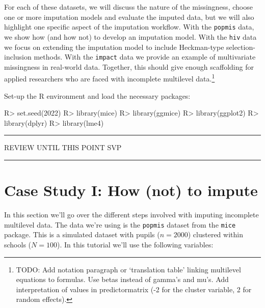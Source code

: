 \documentclass[
]{jss}
\begin{document}
For each of these datasets, we will discuss the nature of the
missingness, choose one or more imputation models and evaluate the
imputed data, but we will also highlight one specific aspect of the
imputation workflow. With the \texttt{popmis} data, we show how (and how
not) to develop an imputation model. With the \texttt{hiv} data we focus
on extending the imputation model to include Heckman-type
selection-inclusion methods. With the \texttt{impact} data we provide an
example of multivariate missingness in real-world data. Together, this
should give enough scaffolding for applied researchers who are faced
with incomplete multilevel data.\footnote{TODO: Add notation paragraph
  or `translation table' linking multilevel equations to 
  formulas. Use betas instead of gamma's and mu's. Add interpretation of
  values in predictormatrix (-2 for the cluster variable, 2 for random
  effects).}

Set-up the R environment and load the necessary packages:

\begin{CodeChunk}
\begin{CodeInput}
R> set.seed(2022)
R> library(mice)
R> library(ggmice)
R> library(ggplot2)
R> library(dplyr)
R> library(lme4)
\end{CodeInput}
\end{CodeChunk}

\begin{center}\rule{0.5\linewidth}{0.5pt}\end{center}

\begin{center}
REVIEW UNTIL THIS POINT SVP
\end{center}

\begin{center}\rule{0.5\linewidth}{0.5pt}\end{center}

\hypertarget{case-study-i-how-not-to-impute}{%
\section{Case Study I: How (not) to
impute}\label{case-study-i-how-not-to-impute}}

In this section we'll go over the different steps involved with imputing
incomplete multilevel data. The data we're using is the \texttt{popmis}
dataset from the \texttt{mice} package. This is a simulated dataset with
pupils (\(n = 2000\)) clustered within schools (\(N = 100\)). In this
tutorial we'll use the following variables:
\end{document}
